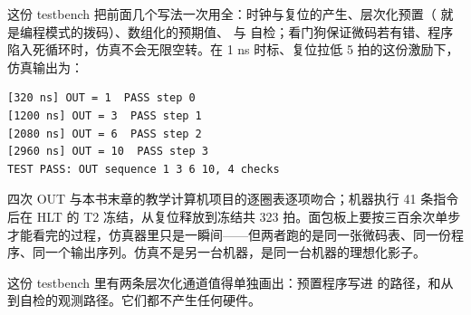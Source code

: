 这份 testbench 把前面几个写法一次用全：时钟与复位的产生、层次化预置（ 就是编程模式的拨码）、数组化的预期值、 与  自检；看门狗保证微码若有错、程序陷入死循环时，仿真不会无限空转。在 1 ns 时标、复位拉低 5 拍的这份激励下，仿真输出为：

\begin{lstlisting}
[320 ns] OUT = 1  PASS step 0
[1200 ns] OUT = 3  PASS step 1
[2080 ns] OUT = 6  PASS step 2
[2960 ns] OUT = 10  PASS step 3
TEST PASS: OUT sequence 1 3 6 10, 4 checks
\end{lstlisting}

四次 OUT 与本书末章的教学计算机项目的逐圈表逐项吻合；机器执行 41 条指令后在 HLT 的 T2 冻结，从复位释放到冻结共 323 拍。面包板上要按三百余次单步才能看完的过程，仿真器里只是一瞬间——但两者跑的是同一张微码表、同一份程序、同一个输出序列。仿真不是另一台机器，是同一台机器的理想化影子。

这份 testbench 里有两条层次化通道值得单独画出：预置程序写进  的路径，和从  到自检的观测路径。它们都不产生任何硬件。

